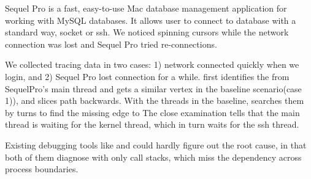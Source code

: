 Sequel Pro is a fast, easy-to-use Mac database management application for
working with MySQL databases. It allows user to connect to database with a
standard way, socket or ssh. We noticed spinning cursors while the network
connection was lost and Sequel Pro tried re-connections.

We collected tracing data in two cases: 1) network connected quickly when we
login, and 2) Sequel Pro lost connection for a while. \xxx first identifies the
\spinningnode from SequelPro's main thread and \xxx gets a similar vertex in the
baseline scenario(case 1)), and slices path backwards. With the threads in the
baseline, \xxx searches them by turns to find the missing edge to \spinningnode
The close examination tells that the main thread is waiting for the kernel
thread, which in turn waits for the ssh thread.


Existing debugging tools like  and  could hardly figure
out the root cause, in that both of them diagnose with only call stacks, which
miss the dependency across process boundaries.
